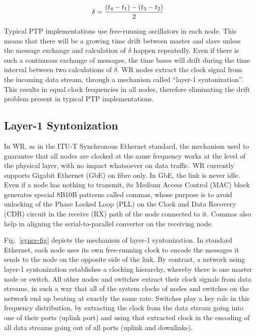 \documentclass{../JAC2003}
\begin{document}
\begin{equation}\label{ptp-eq}
    \delta={{(t_4 - t_1) - (t_3 - t_2)} \over 2} 
\end{equation}

Typical PTP implementations use free-running oscillators in each
node. This means that there will be a growing time drift between
master and slave unless the message exchange and calculation of
$\delta$ happen repeatedly. Even if there is such a continuous
exchange of messages, the time bases will drift during the time
interval between two calculations of $\delta$. WR nodes extract the
clock signal from the incoming data stream, through a mechanism called
``layer-1 syntonization''. This results in equal clock frequencies in
all nodes, therefore eliminating the drift problem present in typical
PTP implementations.

\subsection{Layer-1 Syntonization}

In WR, as in the ITU-T Synchronous Ethernet standard, the mechanism
used to guarantee that all nodes are clocked at the same frequency
works at the level of the physical layer, with no impact whatsoever on
data traffic. WR currently supports Gigabit Ethernet (GbE) on fibre
only. In GbE, the link is never idle. Even if a node has nothing to
transmit, its Medium Access Control (MAC) block generates special
8B10B patterns called commas, whose purpose is to avoid unlocking of the Phase
Locked Loop (PLL) on the Clock and Data Recovery (CDR) circuit in the
receive (RX) path of the node connected to it. Commas also help in aligning the
serial-to-parallel converter on the receiving node. 

Fig.~\ref{synce-fig} depicts the mechanism of layer-1
syntonization. In standard Ethernet, each node uses its own
free-running clock to encode the messages it sends to the node on the
opposite side of the link. By contrast, a network using layer-1
syntonization establishes a clocking hierarchy, whereby there is one
master node or switch. All other nodes and switches extract their
clock signals from data streams, in such a way that all of the system
clocks of nodes and switches on the network end up beating at exactly
the same rate. Switches play a key role in this frequency
distribution, by extracting the clock from the data stream going into
one of their ports (uplink port) and using that extracted clock in the
encoding of all data streams going out of all ports (uplink and
downlinks).
\end{document}
